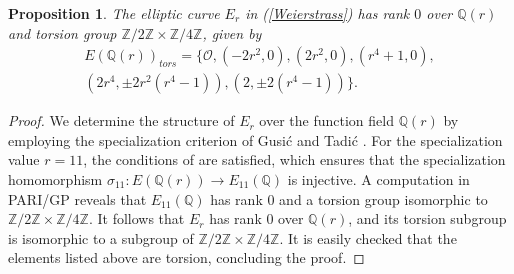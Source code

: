 \documentclass{amsart}
\newtheorem{prop}{Proposition}
\begin{document}
\begin{prop}
    The elliptic curve $E_r$ in (\ref{Weierstrass}) has rank $0$ over $\mathbb{Q}(r)$ and torsion group $\mathbb{Z}/2\mathbb{Z}\times\mathbb{Z}/4\mathbb{Z}$, given by
\begin{gather*}\label{torsion}
    E(\mathbb{Q}(r))_{tors} = \{\mathcal{O}, (-2r^2,0),(2r^2,0),(r^4+1,0),\\
    (2r^4, \pm 2r^2(r^4-1)), (2, \pm2(r^4-1))\}.
\end{gather*}
\end{prop} 
\begin{proof} %
We determine the structure of $E_r$ over the function field $\mathbb{Q}(r)$ by employing the specialization criterion of Gusić and Tadić \cite{GUSIC2015137}. For the specialization value $r=11$, the conditions of \cite[Theorem 1.1]{GUSIC2015137} are satisfied, which ensures that the specialization homomorphism $\sigma_{11} : E(\mathbb{Q}(r)) \to E_{11}(\mathbb{Q})$ is injective. A computation in PARI/GP reveals that $E_{11}(\mathbb{Q})$ has rank $0$ and a torsion group isomorphic to $\mathbb{Z}/2\mathbb{Z} \times \mathbb{Z}/4\mathbb{Z}$. It follows that $E_r$ has rank $0$ over $\mathbb{Q}(r)$, and its torsion subgroup is isomorphic to a subgroup of $\mathbb{Z}/2\mathbb{Z} \times \mathbb{Z}/4\mathbb{Z}$. It is easily checked that the elements listed above are torsion, concluding the proof. 
\end{proof}
\end{document}

